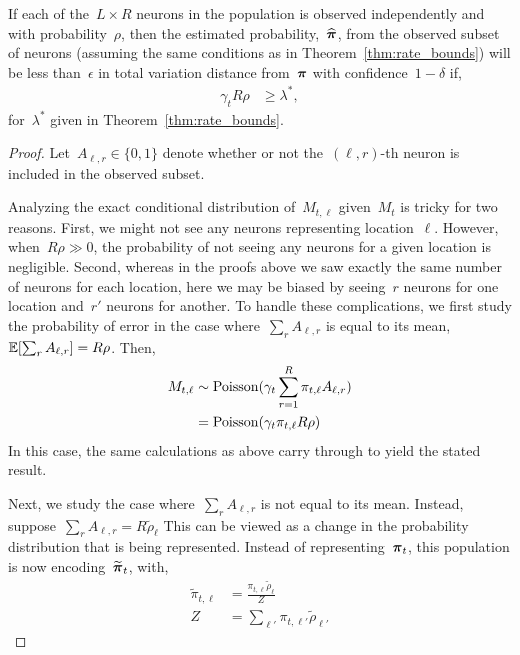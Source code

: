 \begin{corollary} 
  If each of the~$L \times R$ neurons in the population is observed 
  independently and with probability~$\rho$, then the estimated probability,~$\widehat{\boldsymbol{\pi}}$, 
  from the observed subset of neurons (assuming the same 
  conditions as in Theorem~\ref{thm:rate_bounds}) will be less 
  than~$\epsilon$ in total variation distance from~$\boldsymbol{\pi}$ 
  with confidence~$1-\delta$ if,
  \begin{align}
    \gamma_t R \rho &\geq \lambda^*,
  \end{align}
  for~$\lambda^*$ given in Theorem~\ref{thm:rate_bounds}.
\end{corollary}

\begin{proof}
  Let~$A_{\ell,r} \in \{0,1\}$ denote whether or not the~$(\ell,r)$-th neuron 
  is included in the observed subset.
  
  Analyzing the exact conditional distribution of~$M_{t, \ell}$
  given~$M_t$ is tricky for two reasons. First, we might not see any
  neurons representing location~$\ell$.  However, when~$R\rho \gg 0$,
  the probability of not seeing any neurons for a given location is
  negligible. Second, whereas in the proofs above we saw exactly the
  same number of neurons for each location, here we may be biased by
  seeing~$r$ neurons for one location and~$r'$ neurons for another. To
  handle these complications, we first study the probability of error
  in the case where~$\sum_{r} A_{\ell, r}$ is equal to its mean,
  $\mathbb{E}[\sum_{r} A_{\ell, r}] = R\rho$. Then,
  \begin{align}
    M_{t, \ell} &\sim \mathrm{Poisson}(\gamma_t \sum_{r=1}^R \pi_{t, \ell} A_{\ell, r}) \\
    &= \mathrm{Poisson}(  \gamma_t \pi_{t, \ell} R \rho)
  \end{align}
  In this case, the same calculations as above carry through to yield
  the stated result. 

  \sloppy
  Next, we study the case where~$\sum_{r} A_{\ell,r}$ is not equal to
  its mean. Instead, suppose~${\sum_{r} A_{\ell, r}=R \widetilde{\rho}_\ell}$
  This can be viewed as a change in
  the probability distribution that is being represented. Instead of
  representing~$\boldsymbol{\pi}_t$, this population is now encoding~$\widetilde{\boldsymbol{\pi}}_t$,
  with,
  \begin{align}
    \widetilde{\pi}_{t, \ell} &= \frac{\pi_{t, \ell} \widetilde{\rho}_\ell}{Z}\\
    Z &= \sum_{\ell'} \pi_{t, \ell'} \widetilde{\rho}_{\ell'}
  \end{align}


\end{proof}
